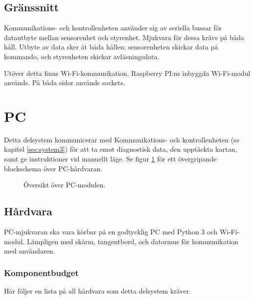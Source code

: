 \documentclass[a4paper,11pt]{article}
\begin{document}
\subsection{Gränssnitt} \label{ssec:brainInterface}
Kommunikations- och kontrollenheten använder sig av seriella bussar för datautbyte mellan sensorenhet och styrenhet. Mjukvara för dessa krävs på båda håll. Utbyte av data sker åt båda hållen; sensorenheten skickar data på kommando, och styrenheten skickar avläsningsdata.

Utöver detta finns Wi-Fi-kommunikation. Raspberry PI:ns inbyggda Wi-Fi-modul används. På båda sidor används sockets.

\newpage
\section{PC} \label{sec:system4}
Detta delsystem kommunicerar med Kommunikations- och kontrollenheten (se kapitel \ref{sec:system3}) för att ta emot diagnostisk data, den upptäckta kartan, samt ge instruktioner vid manuellt läge. Se figur \ref{fig:unitPC} för ett övergripande blockschema över PC-hårdvaran.

\begin{figure}[h!]
    \caption{Översikt över PC-modulen.}
    \label{fig:unitPC}
\end{figure}
\subsection{Hårdvara}
PC-mjukvaran ska vara körbar på en godtycklig PC med Python 3 och Wi-Fi-modul. Lämpligen med skärm, tangentbord, och datormus för kommunikation med användaren.

\subsubsection{Komponentbudget}
Här följer en lista på all hårdvara som detta delsystem kräver.
\end{document}
